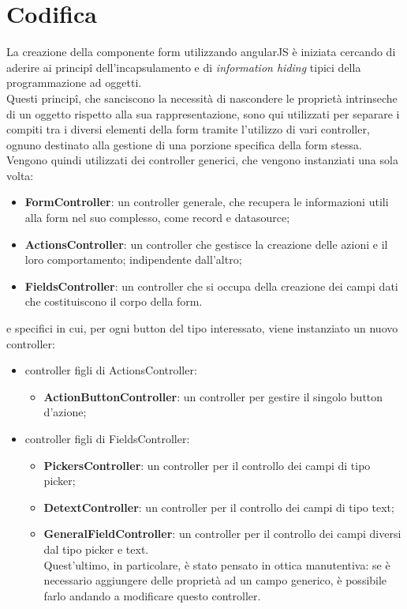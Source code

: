 \section{Codifica}
La creazione della componente form utilizzando angularJS è iniziata cercando di aderire ai principî dell'incapsulamento e di \emph{information hiding} tipici della programmazione ad oggetti.\\ Questi principî, che sanciscono la necessità di nascondere le proprietà intrinseche di un oggetto rispetto alla sua rappresentazione, sono qui utilizzati per separare i compiti tra i diversi elementi della form tramite l'utilizzo di vari controller, ognuno destinato alla gestione di una porzione specifica della form stessa.\\
Vengono quindi utilizzati dei controller generici, che vengono instanziati una sola volta:
\begin{itemize}
	\item \textbf{FormController}: un controller generale, che recupera le informazioni utili alla form nel suo complesso, come record e datasource;
	\item \textbf{ActionsController}: un controller che gestisce la creazione delle azioni e il loro comportamento; indipendente dall'altro;
	\item \textbf{FieldsController}: un controller che si occupa della creazione dei campi dati che costituiscono il corpo della form.
\end{itemize}
e specifici in cui, per ogni button del tipo interessato, viene instanziato un nuovo controller:
\begin{itemize}
	\item controller figli di ActionsController:
	\begin{itemize}
		\item \textbf{ActionButtonController}: un controller per gestire il singolo button d'azione;
	\end{itemize} 
	\item controller figli di FieldsController:
	\begin{itemize}
		\item \textbf{PickersController}: un controller per il controllo dei campi di tipo picker;
		\item \textbf{DetextController}: un controller per il controllo dei campi di tipo text;
		\item \textbf{GeneralFieldController}: un controller per il controllo dei campi diversi dal tipo picker e text. \\Quest'ultimo, in particolare, è stato pensato in ottica manutentiva: se è necessario aggiungere delle proprietà ad un campo generico, è possibile farlo andando a modificare questo controller.
	\end{itemize} 
\end{itemize} 

